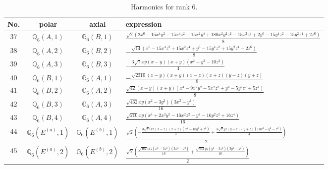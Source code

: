 \documentclass[fleqn,8pt,landscape]{jsarticle}
\begin{document}
\begin{table}[ht!]
\begin{center}
\caption{Harmonics for rank 6.}
\renewcommand{\arraystretch}{1.3}
\begin{tabular}{cccl} \hline \hline
No. & polar & axial & expression \\ \hline
$ 37 $ & $ \mathbb{Q}_{6}(A,1) $ & $ \mathbb{G}_{6}(B,1) $ & $ \frac{\sqrt{2} \left(2 x^{6} - 15 x^{4} y^{2} - 15 x^{4} z^{2} - 15 x^{2} y^{4} + 180 x^{2} y^{2} z^{2} - 15 x^{2} z^{4} + 2 y^{6} - 15 y^{4} z^{2} - 15 y^{2} z^{4} + 2 z^{6}\right)}{8} $ \\
$ 38 $ & $ \mathbb{Q}_{6}(A,2) $ & $ \mathbb{G}_{6}(B,2) $ & $ - \frac{\sqrt{14} \left(x^{6} - 15 x^{4} z^{2} + 15 x^{2} z^{4} + y^{6} - 15 y^{4} z^{2} + 15 y^{2} z^{4} - 2 z^{6}\right)}{8} $ \\
$ 39 $ & $ \mathbb{Q}_{6}(A,3) $ & $ \mathbb{G}_{6}(B,3) $ & $ - \frac{3 \sqrt{7} x y \left(x - y\right) \left(x + y\right) \left(x^{2} + y^{2} - 10 z^{2}\right)}{4} $ \\
$ 40 $ & $ \mathbb{Q}_{6}(B,1) $ & $ \mathbb{G}_{6}(A,1) $ & $ - \frac{\sqrt{2310} \left(x - y\right) \left(x + y\right) \left(x - z\right) \left(x + z\right) \left(y - z\right) \left(y + z\right)}{8} $ \\
$ 41 $ & $ \mathbb{Q}_{6}(B,2) $ & $ \mathbb{G}_{6}(A,2) $ & $ \frac{\sqrt{42} \left(x - y\right) \left(x + y\right) \left(x^{4} - 9 x^{2} y^{2} - 5 x^{2} z^{2} + y^{4} - 5 y^{2} z^{2} + 5 z^{4}\right)}{8} $ \\
$ 42 $ & $ \mathbb{Q}_{6}(B,3) $ & $ \mathbb{G}_{6}(A,3) $ & $ \frac{\sqrt{462} x y \left(x^{2} - 3 y^{2}\right) \left(3 x^{2} - y^{2}\right)}{16} $ \\
$ 43 $ & $ \mathbb{Q}_{6}(B,4) $ & $ \mathbb{G}_{6}(A,4) $ & $ \frac{\sqrt{210} x y \left(x^{4} + 2 x^{2} y^{2} - 16 x^{2} z^{2} + y^{4} - 16 y^{2} z^{2} + 16 z^{4}\right)}{16} $ \\
$ 44 $ & $ \mathbb{Q}_{6}(E^{(a)},1) $ & $ \mathbb{G}_{6}(E^{(b)},1) $ & $ \frac{\sqrt{2} \left(- \frac{3 \sqrt{7} i x z \left(x - z\right) \left(x + z\right) \left(x^{2} - 10 y^{2} + z^{2}\right)}{4} + \frac{3 \sqrt{7} y z \left(y - z\right) \left(y + z\right) \left(10 x^{2} - y^{2} - z^{2}\right)}{4}\right)}{2} $ \\
$ 45 $ & $ \mathbb{Q}_{6}(E^{(a)},2) $ & $ \mathbb{G}_{6}(E^{(b)},2) $ & $ \frac{\sqrt{2} \left(\frac{\sqrt{462} i x z \left(x^{2} - 3 z^{2}\right) \left(3 x^{2} - z^{2}\right)}{16} + \frac{\sqrt{462} y z \left(y^{2} - 3 z^{2}\right) \left(3 y^{2} - z^{2}\right)}{16}\right)}{2} $ \\

\end{tabular}
\end{center}
\end{table}
\end{document}
